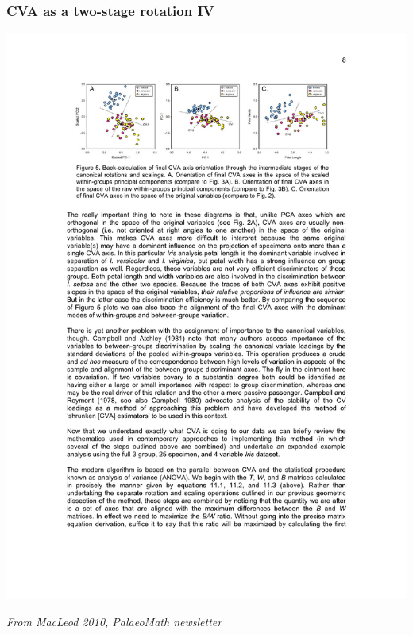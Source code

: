 \documentclass{beamer}
\begin{document}
\begin{frame}
  \frametitle{CVA as a two-stage rotation IV}

\begin{center}
\includegraphics[width=\textwidth]{cva-as-rot4}
\end{center}

\hfill {\scriptsize \textit{From MacLeod 2010, PalaeoMath newsletter}}

\end{frame}
\end{document}
